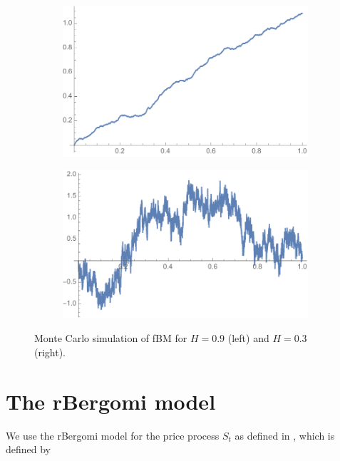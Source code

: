 \documentclass[11pt]{article}
\begin{document}
\begin{figure}[h!]
	\centering
	\begin{subfigure}{.45\textwidth}
		\centering
		\includegraphics[width=1\linewidth]{./figures/fbm_H_0_9}
		\caption{}
		\label{fig:sub3}
	\end{subfigure}%
	\begin{subfigure}{.45\textwidth}
		\centering
		\includegraphics[width=1\linewidth]{./figures/fbm_H_0_3}
		\caption{}
		\label{fig:sub4}
	\end{subfigure}
	\caption{Monte Carlo simulation of fBM for $H = 0.9$ (left) and $H = 0.3$ (right).}
	\label{fig:fBM}
\end{figure}




\section{The rBergomi model}\label{sec:The rBergomi model}

We use  the rBergomi model for the price process $S_t$ as defined in  \cite{bayer2016pricing}, which is defined by
\end{document}
